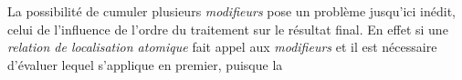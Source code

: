La possibilité de cumuler plusieurs \emph{modifieurs} pose un problème
jusqu'ici inédit, celui de l'influence de l'ordre du traitement sur le
résultat final. En effet si une \emph{relation de localisation
  atomique} fait appel aux \emph{modifieurs}  et
 il est nécessaire d'évaluer lequel s'applique en
premier, puisque la 

